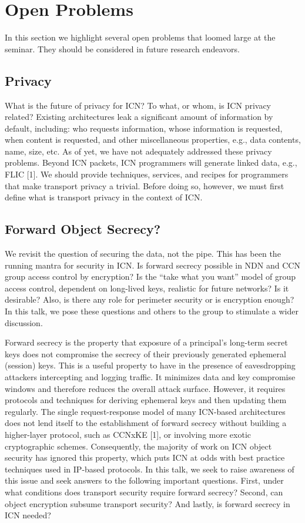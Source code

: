 \section{Open Problems}
In this section we highlight several open problems that loomed large at the
seminar. They should be considered in future research endeavors.

\subsection{Privacy}
What is the future of privacy for ICN? To what, or whom, is ICN privacy related?
Existing architectures leak a significant amount of information by default,
including: who requests information, whose information is requested, when content
is requested, and other miscellaneous properties, e.g., data contents, name, size,
etc. As of yet, we have not adequately addressed these privacy problems.
Beyond ICN packets, ICN programmers will generate linked data, e.g., FLIC [1]. We
should provide techniques, services, and recipes for programmers that make transport
privacy a trivial. Before doing so, however, we must first define what is transport
privacy in the context of ICN.

\subsection{Forward Object Secrecy?}
We revisit the question of securing the data, not the pipe. This has been the
running mantra for security in ICN. Is forward secrecy possible in NDN and CCN
group access control by encryption? Is the ``take what you want'' model of group
access control, dependent on long-lived keys, realistic for future networks? Is
it desirable? Also, is there any role for perimeter security or is encryption
enough? In this talk, we pose these questions and others to the group to stimulate
a wider discussion.

Forward secrecy is the property that exposure of a principal's long-term secret keys
does not compromise the secrecy of their previously generated ephemeral (session)
keys. This is a useful property to have in the presence of eavesdropping attackers
intercepting and logging traffic. It minimizes data and key compromise windows and
therefore reduces the overall attack surface. However, it requires protocols and
techniques for deriving ephemeral keys and then updating them regularly. The single
request-response model of many ICN-based architectures does not lend itself to the
establishment of forward secrecy without building a higher-layer protocol, such as
CCNxKE [1], or involving more exotic cryptographic schemes. Consequently, the
majority of work on ICN object security has ignored this property, which puts ICN
at odds with best practice techniques used in IP-based protocols. In this talk, we
seek to raise awareness of this issue and seek answers to the following important
questions. First, under what conditions does transport security require forward
secrecy? Second, can object encryption subsume transport security? And lastly, is
forward secrecy in ICN needed?

